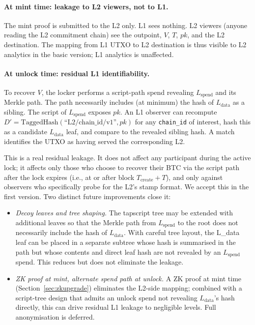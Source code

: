 \documentclass[11pt,a4paper]{article}
\begin{document}
\paragraph{At mint time: leakage to L2 viewers, not to L1.} The mint proof is submitted to the L2 only. L1 sees nothing. L2 viewers (anyone reading the L2 commitment chain) see the outpoint, $V$, $T$, $pk$, and the L2 destination. The mapping from L1 UTXO to L2 destination is thus visible to L2 analytics in the basic version; L1 analytics is unaffected.

\paragraph{At unlock time: residual L1 identifiability.} To recover $V$, the locker performs a script-path spend revealing $L_{\mathrm{spend}}$ and its Merkle path. The path necessarily includes (at minimum) the hash of $L_{\mathrm{data}}$ as a sibling. The script of $L_{\mathrm{spend}}$ exposes $pk$. An L1 observer can recompute $D' = \mathrm{TaggedHash}(\text{``L2/chain\_id/v1''}, pk)$ for any \texttt{chain\_id} of interest, hash this as a candidate $L_{\mathrm{data}}$ leaf, and compare to the revealed sibling hash. A match identifies the UTXO as having served the corresponding L2.

This is a real residual leakage. It does not affect any participant during the active lock; it affects only those who choose to recover their BTC via the script path after the lock expires (i.e., at or after block $T_{\mathrm{create}} + T$), and only against observers who specifically probe for the L2's stamp format. We accept this in the first version. Two distinct future improvements close it:

\begin{itemize}[leftmargin=*]
  \item \emph{Decoy leaves and tree shaping.} The tapscript tree may be extended with additional leaves so that the Merkle path from $L_{\mathrm{spend}}$ to the root does not necessarily include the hash of $L_{\mathrm{data}}$. With careful tree layout, the L_data leaf can be placed in a separate subtree whose hash is summarised in the path but whose contents and direct leaf hash are not revealed by an $L_{\mathrm{spend}}$ spend. This reduces but does not eliminate the leakage.
  \item \emph{ZK proof at mint, alternate spend path at unlock.} A ZK proof at mint time (Section~\ref{sec:zkupgrade}) eliminates the L2-side mapping; combined with a script-tree design that admits an unlock spend not revealing $L_{\mathrm{data}}$'s hash directly, this can drive residual L1 leakage to negligible levels. Full anonymisation is deferred.
\end{itemize}
\end{document}
